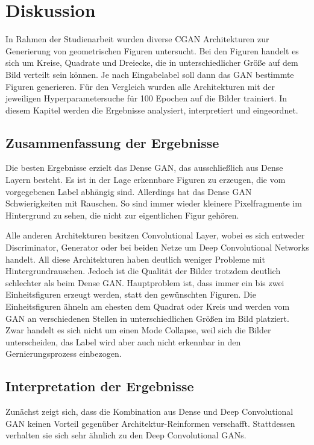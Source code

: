 
\chapter{Diskussion}

In Rahmen der Studienarbeit wurden diverse CGAN Architekturen zur Generierung von geometrischen Figuren untersucht.
Bei den Figuren handelt es sich um Kreise, Quadrate und Dreiecke, die in unterschiedlicher Größe auf dem Bild verteilt sein können.
Je nach Eingabelabel soll dann das GAN bestimmte Figuren generieren.
Für den Vergleich wurden alle Architekturen mit der jeweiligen Hyperparametersuche für 100 Epochen auf die Bilder trainiert.
In diesem Kapitel werden die Ergebnisse analysiert, interpretiert und eingeordnet.

\section{Zusammenfassung der Ergebnisse}
Die besten Ergebnisse erzielt das Dense GAN, das ausschließlich aus Dense Layern besteht.
Es ist in der Lage erkennbare Figuren zu erzeugen, die vom vorgegebenen Label abhängig sind.
Allerdings hat das Dense GAN Schwierigkeiten mit Rauschen.
So sind immer wieder kleinere Pixelfragmente im Hintergrund zu sehen, die nicht zur eigentlichen Figur gehören.
\newline

Alle anderen Architekturen besitzen Convolutional Layer, wobei es sich entweder Discriminator, Generator oder bei beiden Netze um Deep Convolutional Networks handelt.
All diese Architekturen haben deutlich weniger Probleme mit Hintergrundrauschen.
Jedoch ist die Qualität der Bilder trotzdem deutlich schlechter als beim Dense GAN.
Hauptproblem ist, dass immer ein bis zwei Einheitsfiguren erzeugt werden, statt den gewünschten Figuren.
Die Einheitsfiguren ähneln am ehesten dem Quadrat oder Kreis und werden vom GAN an verschiedenen Stellen in unterschiedlichen Größen im Bild platziert.
Zwar handelt es sich nicht um einen Mode Collapse, weil sich die Bilder unterscheiden, das Label wird aber auch nicht erkennbar in den Gernierungsprozess einbezogen.

\section{Interpretation der Ergebnisse}
Zunächst zeigt sich, dass die Kombination aus Dense und Deep Convolutional GAN keinen Vorteil gegenüber Architektur-Reinformen verschafft.
Stattdessen verhalten sie sich sehr ähnlich zu den Deep Convolutional GANs.

